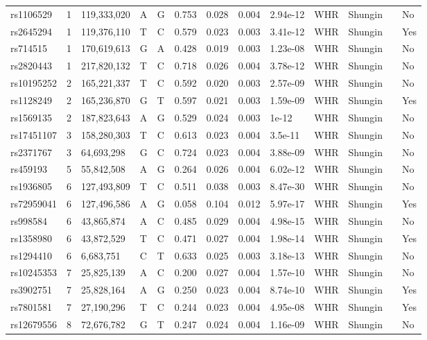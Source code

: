 \documentclass[11pt,twoside]{bristolthesis}
\begin{document}
\begin{longtable}[t]{lrlllrrrlllll}
rs1106529 & 1 & 119,333,020 & A & G & 0.753 & 0.028 & 0.004 & 2.94e-12 & WHR & Shungin &  & No\\
rs2645294 & 1 & 119,376,110 & T & C & 0.579 & 0.023 & 0.003 & 3.41e-12 & WHR & Shungin &  & Yes\\
\addlinespace
rs714515 & 1 & 170,619,613 & G & A & 0.428 & 0.019 & 0.003 & 1.23e-08 & WHR & Shungin &  & No\\
rs2820443 & 1 & 217,820,132 & T & C & 0.718 & 0.026 & 0.004 & 3.78e-12 & WHR & Shungin &  & No\\
rs10195252 & 2 & 165,221,337 & T & C & 0.592 & 0.020 & 0.003 & 2.57e-09 & WHR & Shungin &  & No\\
rs1128249 & 2 & 165,236,870 & G & T & 0.597 & 0.021 & 0.003 & 1.59e-09 & WHR & Shungin &  & Yes\\
rs1569135 & 2 & 187,823,643 & A & G & 0.529 & 0.024 & 0.003 & 1e-12 & WHR & Shungin &  & No\\
\addlinespace
rs17451107 & 3 & 158,280,303 & T & C & 0.613 & 0.023 & 0.004 & 3.5e-11 & WHR & Shungin &  & No\\
rs2371767 & 3 & 64,693,298 & G & C & 0.724 & 0.023 & 0.004 & 3.88e-09 & WHR & Shungin &  & No\\
rs459193 & 5 & 55,842,508 & A & G & 0.264 & 0.026 & 0.004 & 6.02e-12 & WHR & Shungin &  & No\\
rs1936805 & 6 & 127,493,809 & T & C & 0.511 & 0.038 & 0.003 & 8.47e-30 & WHR & Shungin &  & No\\
rs72959041 & 6 & 127,496,586 & A & G & 0.058 & 0.104 & 0.012 & 5.97e-17 & WHR & Shungin &  & Yes\\
\addlinespace
rs998584 & 6 & 43,865,874 & A & C & 0.485 & 0.029 & 0.004 & 4.98e-15 & WHR & Shungin &  & No\\
rs1358980 & 6 & 43,872,529 & T & C & 0.471 & 0.027 & 0.004 & 1.98e-14 & WHR & Shungin &  & Yes\\
rs1294410 & 6 & 6,683,751 & C & T & 0.633 & 0.025 & 0.003 & 3.18e-13 & WHR & Shungin &  & No\\
rs10245353 & 7 & 25,825,139 & A & C & 0.200 & 0.027 & 0.004 & 1.57e-10 & WHR & Shungin &  & No\\
rs3902751 & 7 & 25,828,164 & A & G & 0.250 & 0.023 & 0.004 & 8.74e-10 & WHR & Shungin &  & Yes\\
\addlinespace
rs7801581 & 7 & 27,190,296 & T & C & 0.244 & 0.023 & 0.004 & 4.95e-08 & WHR & Shungin &  & Yes\\
rs12679556 & 8 & 72,676,782 & G & T & 0.247 & 0.024 & 0.004 & 1.16e-09 & WHR & Shungin &  & No\\

\end{longtable}
\end{document}
